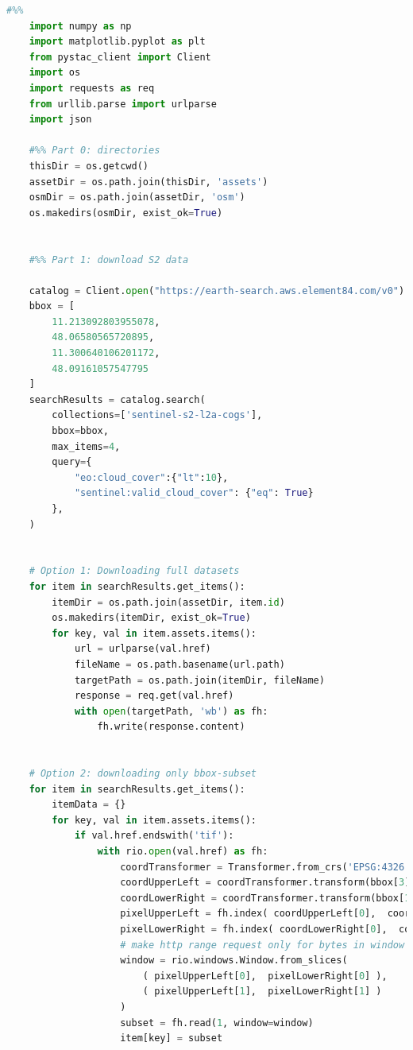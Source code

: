 \begin{lstlisting}[language=python]
    #%%
    import numpy as np
    import matplotlib.pyplot as plt
    from pystac_client import Client
    import os
    import requests as req
    from urllib.parse import urlparse
    import json
    
    #%% Part 0: directories
    thisDir = os.getcwd()
    assetDir = os.path.join(thisDir, 'assets')
    osmDir = os.path.join(assetDir, 'osm')
    os.makedirs(osmDir, exist_ok=True)
    
    
    #%% Part 1: download S2 data
    
    catalog = Client.open("https://earth-search.aws.element84.com/v0")
    bbox = [
        11.213092803955078,
        48.06580565720895,
        11.300640106201172,
        48.09161057547795
    ]
    searchResults = catalog.search(
        collections=['sentinel-s2-l2a-cogs'],
        bbox=bbox,
        max_items=4,
        query={
            "eo:cloud_cover":{"lt":10},
            "sentinel:valid_cloud_cover": {"eq": True}
        },
    )
    
    
    # Option 1: Downloading full datasets
    for item in searchResults.get_items():
        itemDir = os.path.join(assetDir, item.id)
        os.makedirs(itemDir, exist_ok=True)
        for key, val in item.assets.items():
            url = urlparse(val.href)
            fileName = os.path.basename(url.path)
            targetPath = os.path.join(itemDir, fileName)
            response = req.get(val.href)
            with open(targetPath, 'wb') as fh:
                fh.write(response.content)
    

    # Option 2: downloading only bbox-subset
    for item in searchResults.get_items():
        itemData = {}
        for key, val in item.assets.items():
            if val.href.endswith('tif'):
                with rio.open(val.href) as fh:
                    coordTransformer = Transformer.from_crs('EPSG:4326', fh.crs)
                    coordUpperLeft = coordTransformer.transform(bbox[3], bbox[0])
                    coordLowerRight = coordTransformer.transform(bbox[1], bbox[2]) 
                    pixelUpperLeft = fh.index( coordUpperLeft[0],  coordUpperLeft[1] )
                    pixelLowerRight = fh.index( coordLowerRight[0],  coordLowerRight[1] )
                    # make http range request only for bytes in window
                    window = rio.windows.Window.from_slices(
                        ( pixelUpperLeft[0],  pixelLowerRight[0] ), 
                        ( pixelUpperLeft[1],  pixelLowerRight[1] )
                    )
                    subset = fh.read(1, window=window)
                    item[key] = subset
    

\end{lstlisting}
